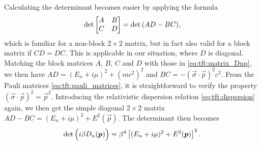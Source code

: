 Calculating the determinant becomes easier by applying the formula
\cite[theorem 3]{ref:determinant_block_matrix}
\begin{equation}
	\operatorname{det} \begin{bmatrix} A & B \\ C & D \\ \end{bmatrix} = \operatorname{det}{(AD - BC)} ,
\end{equation}
which is familiar for a non-block $2 \times 2$ matrix, but in fact also valid for a block matrix if $CD = DC$.
This is applicable in our situation, where $D$ is diagonal.
Matching the block matrices $A$, $B$, $C$ and $D$ with those in \cref{eq:tft:matrix_Dnp},
we then have $AD = (E_n + i \mu)^2 + (mc^2)^2$ and $BC = - (\vec{\sigma} \cdot \vec{p})^2 c^2$.
From the Pauli matrices \eqref{eq:tft:pauli_matrices}, it is straightforward to verify the property $(\vec{\sigma} \cdot \vec{p})^2 = \vec{p}^2$.
Introducing the relativistic dispersion relation \eqref{eq:tft:dispersion} again, we then get the simple diagonal $2 \times 2$ matrix
$AD - BC = (E_n + i \mu)^2 + E^2(\vec{p})$.
The determinant then becomes
\begin{equation}
	\operatorname{det} \Big( i \beta D_n({\bm{p}}) \Big) = \beta^4 \left[ (E_n + i \mu)^2 + E^2({\bm{p}}) \right]^2 .
\end{equation}

\iffalse
\begin{equation}
\begin{split}
	\tdet D  & = \tdet \left\{ -\beta \hbar \omega_n - i \beta \mu + i \beta m c^2 \gamma^0 + i \beta c \gamma^0 \vec{\gamma} \cdot \vec{p} \right\} \\
	         & = \tdet \begin{pmatrix} 
	                 -\beta \hbar \omega_n - i \beta \mu + i \beta m c^2           & i \beta c \vec{\sigma} \cdot \vec{p}                \\ 
	                 i \beta c \vec{\sigma} \cdot \vec{p}                          & -\beta \hbar \omega_n - i \beta \mu - i \beta m c^2 \\ 
	             \end{pmatrix} \\
	         & = \tdet \left\{ (-\beta \hbar \omega_n - i \beta \mu + i \beta mc^2) (-\beta \hbar \omega_n - i \beta \mu - i \beta m c^2) + \beta^2 c^2 (\vec{\sigma} \cdot \vec{p})^2 \right\} \\
	         & = \tdet \left\{ (-\beta \hbar \omega_n - i \beta \mu)^2 + (\beta m c^2)^2 + \beta^2 c^2 \underbrace{(\vec{\sigma} \cdot \vec{p})^2}_{\vec{p}^2} \right\} \\
	         & = \tdet \left\{ \beta^2 \left[ (\hbar \omega_n + i \mu)^2 + \hbar^2 \omega^2 \right] \right\} \\
	         & = \beta^4 \left[ (\hbar \omega_n + i \mu)^2 + \hbar^2 \omega^2 \right]^2
\end{split}
\end{equation}
(TODO: to 4th or 2nd power when taking determinant of diagonal matrix?)
\fi

